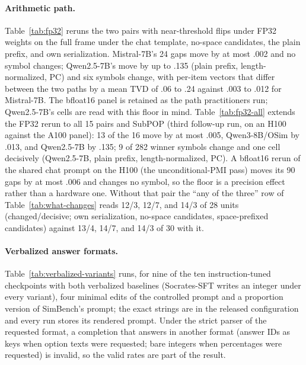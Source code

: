 \documentclass[11pt]{article}
\newcommand{\PC}{\textsc{PC}}
\begin{document}
\paragraph{Arithmetic path.}
Table~\ref{tab:fp32} reruns the two pairs with near-threshold flips under
FP32 weights on the full frame under the chat template, no-space candidates,
the plain prefix, and own serialization. Mistral-7B's 24 gaps move by at
most .002 and no symbol changes; Qwen2.5-7B's move by up to .135 (plain
prefix, length-normalized, \PC{}) and six symbols change, with per-item
vectors that differ between the two paths by a mean TVD of .06 to .24
against .003 to .012 for Mistral-7B. The bfloat16 panel is retained as the path practitioners run; Qwen2.5-7B's cells are read with this floor in mind. Table~\ref{tab:fp32-all} extends the FP32 rerun to all 15 pairs and SubPOP (third follow-up run, on an H100 against the A100 panel): 13 of the 16 move by at most .005, Qwen3-8B/OSim by .013, and Qwen2.5-7B by .135; 9 of 282 winner symbols change and one cell decisively (Qwen2.5-7B, plain prefix, length-normalized, \PC{}). A bfloat16 rerun of the shared chat prompt on the H100 (the unconditional-PMI pass) moves its 90 gaps by at most .006 and changes no symbol, so the floor is a precision effect rather than a hardware one. Without that pair the ``any of the three'' row of Table~\ref{tab:what-changes} reads 12/3, 12/7, and 14/3 of 28 units (changed/decisive; own serialization, no-space candidates, space-prefixed candidates) against 13/4, 14/7, and 14/3 of 30 with it.

\paragraph{Verbalized answer formats.}
Table~\ref{tab:verbalized-variants} runs, for nine of the ten instruction-tuned
checkpoints with both verbalized baselines (Socrates-SFT writes an integer under every variant), four minimal edits of the
controlled prompt and a proportion version of SimBench's prompt; the exact
strings are in the released configuration and every run stores its rendered
prompt. Under the strict parser of the requested format, a completion that
answers in another format (answer IDs as keys when option texts were
requested; bare integers when percentages were requested) is invalid, so
the valid rates are part of the result.
\end{document}
